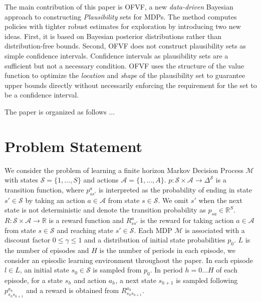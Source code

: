 \documentclass{article}
\newcommand{\Real}{\mathbb{R}}
\newcommand{\states}{\mathcal{S}}
\newcommand{\actions}{\mathcal{A}}
\newcommand{\mdp}{\mathcal{M}}
\theoremstyle{plain}
\theoremstyle{definition}
\begin{document}
The main contribution of this paper is OFVF, a new \emph{data-driven} Bayesian approach to constructing \emph{Plausibility} sets for MDPs. The method computes policies with tighter robust estimates for exploration by introducing two new ideas. First, it is based on Bayesian posterior distributions rather than distribution-free bounds. Second, OFVF does not construct plausibility sets as simple confidence intervals. Confidence intervals as plausibility sets are a sufficient but not a necessary condition. OFVF uses the structure of the value function to optimize the \emph{location} and \emph{shape} of the plausibility set to guarantee upper bounds directly without necessarily enforcing the requirement for the set to be a confidence interval.

The paper is organized as follows ...
\section{Problem Statement}

We consider the problem of learning a finite horizon Markov Decision Process $\mdp$ with states $\states = \{1, \ldots, S \}$ and actions $\actions = \{1, \ldots, A \}$. $p: \states \times \actions \to \Delta^\states$ is a transition function, where $p^a_{ss'}$ is interpreted as the probability of ending in state $s'\in\states$ by taking an action $a\in\actions$ from state $s\in\states$. We omit $s'$ when the next state is not deterministic and denote the transition probability as $p_{sa}\in\Real^S$. $R: \states \times \actions \to \Real$ is a reward function and $R^a_{ss'}$ is the reward for taking action $a\in\actions$ from state $s\in\states$ and reaching state $s'\in\states$. Each MDP $\mdp$ is associated with a discount factor $0\le\gamma\le1$ and a distribution of initial state probabilities $p_0$. $L$ is the number of episodes and $H$ is the number of periods in each episode, we consider an episodic learning environment throughout the paper. In each episode $l\in L$, an initial state $s_0\in\states$ is sampled from $p_0$. In period $h=0\ldots H$ of each episode, for a state $s_h$ and action $a_h$, a next state $s_{h+1}$ is sampled following $p^{a_h}_{s_hs_{h+1}}$ and a reward is obtained from $R^{a_h}_{s_hs_{h+1}}$.
\end{document}
